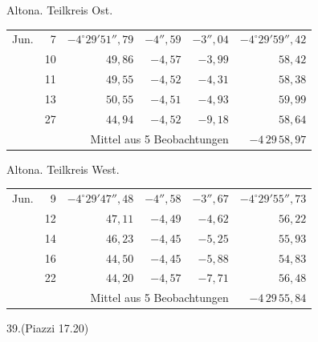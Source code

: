 \noindent\begin{minipage}[t]{.495\textwidth}\centering Altona. Teilkreis Ost.\par\smallskip
{\scriptsize\setlength{\tabcolsep}{1pt}\renewcommand{\arraystretch}{1.2}\begin{tabular}{lr|r|r|r|r|}
Jun.&7&$-4^\circ29'51''{,}79$&$-4''{,}59$&$-3''{,}04$&$-4^\circ29'59''{,}42$\\
&10&$49{,}86$&$-4{,}57$&$-3{,}99$&$58{,}42$\\
&11&$49{,}55$&$-4{,}52$&$-4{,}31$&$58{,}38$\\
&13&$50{,}55$&$-4{,}51$&$-4{,}93$&$59{,}99$\\
&27&$44{,}94$&$-4{,}52$&$-9{,}18$&$58{,}64$\\
\cline{6-6}\multicolumn{5}{r}{Mittel aus 5 Beobachtungen}&$-4\,29\,58{,}97$
\end{tabular}}\end{minipage}\hfill\begin{minipage}[t]{.495\textwidth}\centering Altona. Teilkreis West.\par\smallskip
{\scriptsize\setlength{\tabcolsep}{1pt}\renewcommand{\arraystretch}{1.2}\begin{tabular}{lr|r|r|r|r}
Jun.&9&$-4^\circ29'47''{,}48$&$-4''{,}58$&$-3''{,}67$&$-4^\circ29'55''{,}73$\\
&12&$47{,}11$&$-4{,}49$&$-4{,}62$&$56{,}22$\\
&14&$46{,}23$&$-4{,}45$&$-5{,}25$&$55{,}93$\\
&16&$44{,}50$&$-4{,}45$&$-5{,}88$&$54{,}83$\\
&22&$44{,}20$&$-4{,}57$&$-7{,}71$&$56{,}48$\\
\cline{6-6}\multicolumn{5}{r}{Mittel aus 5 Beobachtungen}&$-4\,29\,55{,}84$
\end{tabular}}\end{minipage}
\par\vspace{4mm}
\begin{center}39.\quad (Piazzi 17.20)\end{center}


